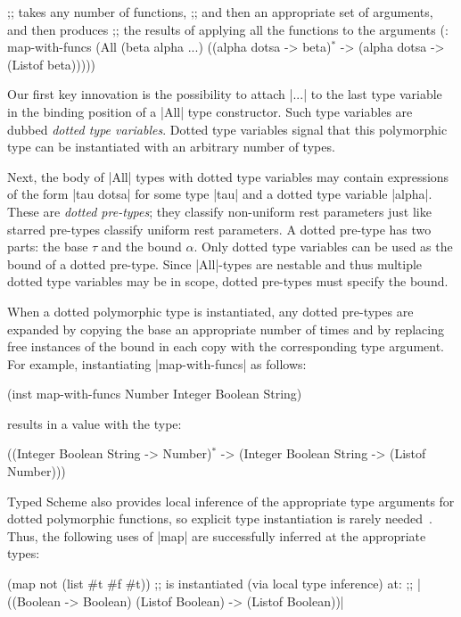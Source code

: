 \begin{schemeregion}
\begin{schemedisplay}
;;  takes any number of functions, 
;; and then an appropriate set of arguments, and then produces 
;; the results of applying all the functions to the arguments
(: map-with-funcs
   (All (beta alpha ...) ((alpha dotsa -> beta)$^*$ -> (alpha dotsa -> (Listof beta)))))
\end{schemedisplay}
Our first key innovation is the possibility to attach \scheme|...| to the last
type variable in the binding position of a \scheme|All| type constructor.
Such type variables are dubbed {\em dotted type variables}.  Dotted type
variables signal that this polymorphic type can be instantiated with an arbitrary
number of types.

Next, the body of \scheme|All| types with dotted type variables may contain
 expressions of the form \scheme|tau dotsa| for some type \scheme|tau| and
 a dotted type variable \scheme|alpha|.  These are {\em dotted pre-types};
 they classify non-uniform rest parameters just like starred pre-types classify
 uniform rest parameters.  A dotted pre-type has two parts: the base $\tau$
 and the bound $\alpha$.  Only dotted type variables can be used as the
 bound of a dotted pre-type. Since \scheme|All|-types are
 nestable and thus multiple dotted type variables may be in scope,
 dotted pre-types must specify the bound.

When a dotted polymorphic type is instantiated, any dotted pre-types
are expanded by copying the base an appropriate number of
times and by replacing free instances of the bound in each copy
with the corresponding type argument.  For example, instantiating
\scheme|map-with-funcs| as follows:
\begin{schemedisplay}
(inst map-with-funcs Number Integer Boolean String)
\end{schemedisplay}
 results in a value with the type:
\begin{schemedisplay}
((Integer Boolean String -> Number)$^*$ ->
(Integer Boolean String -> (Listof Number)))
\end{schemedisplay}

Typed Scheme also provides local inference of the appropriate type
arguments for dotted polymorphic functions, so explicit type
instantiation is rarely needed~\cite{dots-tr}. Thus, the following uses
of \scheme|map| are successfully inferred at the appropriate types:
\begin{schemedisplay}
(map not (list #t #f #t))
;;  is instantiated (via local type inference) at:
;; \scheme|((Boolean -> Boolean) (Listof Boolean) -> (Listof Boolean))|
 

\end{schemedisplay}
\end{schemeregion}

